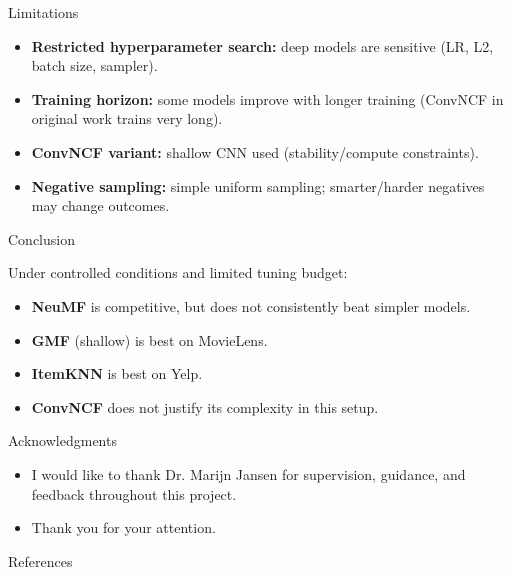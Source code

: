 \documentclass[aspectratio=169,11pt]{beamer}
\begin{document}
\begin{frame}{Limitations}
\begin{itemize}
  \item \textbf{Restricted hyperparameter search:} deep models are sensitive (LR, L2, batch size, sampler).
  \item \textbf{Training horizon:} some models improve with longer training (ConvNCF in original work trains very long).
  \item \textbf{ConvNCF variant:} shallow CNN used (stability/compute constraints).
  \item \textbf{Negative sampling:} simple uniform sampling; smarter/harder negatives may change outcomes.
  
\end{itemize}
\end{frame}



\begin{frame}{Conclusion}
\begin{block}{}
Under controlled conditions and limited tuning budget:
\begin{itemize}
  \item \textbf{NeuMF} is competitive, but does not consistently beat simpler models.
  \item \textbf{GMF} (shallow) is best on MovieLens.
  \item \textbf{ItemKNN} is best on Yelp.
  \item \textbf{ConvNCF} does not justify its complexity in this setup.
\end{itemize}
\end{block}


\end{frame}

\begin{frame}{Acknowledgments}
\begin{itemize}
  \item I would like to thank Dr. Marijn Jansen for supervision, guidance, and feedback throughout this project.
  \item Thank you for your attention.
\end{itemize}
\end{frame}

\begin{frame}[allowframebreaks]{References}


\end{frame}
\end{document}
